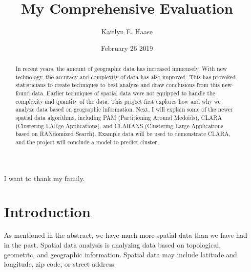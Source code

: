 \documentclass[12pt,twoside]{amherstthesis}
\title{My Comprehensive Evaluation}
\author{Kaitlyn E. Haase}
\date{February 26 2019}
\begin{document}
      \maketitle
  
  \frontmatter %
  \pagestyle{empty} %

      \begin{acknowledgements}
      I want to thank my family.
    \end{acknowledgements}
  
  

      \hypersetup{linkcolor=black}
    \setcounter{tocdepth}{2}
    \tableofcontents
  
      \listoftables
  
      \listoffigures
  
      \begin{abstract}
      In recent years, the amount of geographic data has increased immensely.
      With new technology, the accuracy and complexity of data has also
      improved. This has provoked statisticians to create techniques to best
      analyze and draw conclusions from this new-found data. Earlier
      techniques of spatial data were not equipped to handle the complexity
      and quantity of the data. This project first explores how and why we
      analyze data based on geographic information. Next, I will explain some
      of the newer spatial data algorithms, including PAM (Partitioning Around
      Medoids), CLARA (Clustering LARge Applications), and CLARANS (Clustering
      Large Applications based on RANdomized Search). Example data will be
      used to demonstrate CLARA, and the project will conclude a model to
      predict cluster.
    \end{abstract}
  
  
  \mainmatter %
  \pagestyle{fancyplain} %

  \onehalfspacing
  
  \chapter*{Introduction}\label{introduction}
  
  As mentioned in the abstract, we have much more spatial data than we
  have had in the past. Spatial data analysis is analyzing data based on
  topological, geometric, and geographic information. Spatial data may
  include latitude and longitude, zip code, or street address.
  
\end{document}
